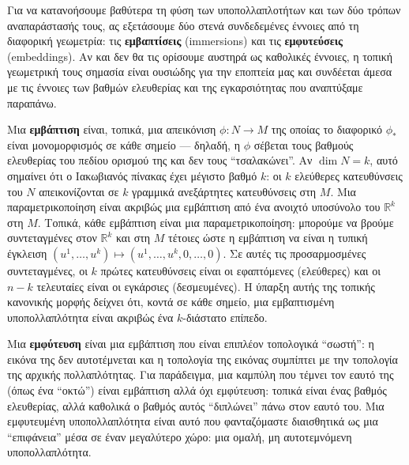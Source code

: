 \documentclass[12pt]{article}
\begin{document}
Για να κατανοήσουμε βαθύτερα τη φύση των υποπολλαπλοτήτων και των δύο τρόπων αναπαράστασής τους, ας εξετάσουμε δύο στενά συνδεδεμένες έννοιες από τη διαφορική γεωμετρία: τις \textbf{εμβαπτίσεις} (immersions) και τις \textbf{εμφυτεύσεις} (embeddings). Αν και δεν θα τις ορίσουμε αυστηρά ως καθολικές έννοιες, η τοπική γεωμετρική τους σημασία είναι ουσιώδης για την εποπτεία μας και συνδέεται άμεσα με τις έννοιες των βαθμών ελευθερίας και της εγκαρσιότητας που αναπτύξαμε παραπάνω.

Μια \textbf{εμβάπτιση} είναι, τοπικά, μια απεικόνιση $\phi: N \to M$ της οποίας το διαφορικό $\phi_*$ είναι μονομορφισμός σε κάθε σημείο --- δηλαδή, η $\phi$ σέβεται τους βαθμούς ελευθερίας του πεδίου ορισμού της και δεν τους ``τσαλακώνει''. Αν $\dim N = k$, αυτό σημαίνει ότι ο Ιακωβιανός πίνακας έχει μέγιστο βαθμό $k$: οι $k$ ελεύθερες κατευθύνσεις του $N$ απεικονίζονται σε $k$ γραμμικά ανεξάρτητες κατευθύνσεις στη $M$. Μια παραμετρικοποίηση είναι ακριβώς μια εμβάπτιση από ένα ανοιχτό υποσύνολο του $\mathbb{R}^k$ στη $M$. Τοπικά, κάθε εμβάπτιση είναι μια παραμετρικοποίηση: μπορούμε να βρούμε συντεταγμένες στον $\mathbb{R}^k$ και στη $M$ τέτοιες ώστε η εμβάπτιση να είναι η τυπική έγκλειση $(u^1, \dots, u^k) \mapsto (u^1, \dots, u^k, 0, \dots, 0)$. Σε αυτές τις προσαρμοσμένες συντεταγμένες, οι $k$ πρώτες κατευθύνσεις είναι οι εφαπτόμενες (ελεύθερες) και οι $n-k$ τελευταίες είναι οι εγκάρσιες (δεσμευμένες). Η ύπαρξη αυτής της τοπικής κανονικής μορφής δείχνει ότι, κοντά σε κάθε σημείο, μια εμβαπτισμένη υποπολλαπλότητα είναι ακριβώς ένα $k$-διάστατο επίπεδο.

Μια \textbf{εμφύτευση} είναι μια εμβάπτιση που είναι επιπλέον τοπολογικά ``σωστή'': η εικόνα της δεν αυτοτέμνεται και η τοπολογία της εικόνας συμπίπτει με την τοπολογία της αρχικής πολλαπλότητας. Για παράδειγμα, μια καμπύλη που τέμνει τον εαυτό της (όπως ένα ``οκτώ'') είναι εμβάπτιση αλλά όχι εμφύτευση: τοπικά είναι ένας βαθμός ελευθερίας, αλλά καθολικά ο βαθμός αυτός ``διπλώνει'' πάνω στον εαυτό του. Μια εμφυτευμένη υποπολλαπλότητα είναι αυτό που φανταζόμαστε διαισθητικά ως μια ``επιφάνεια'' μέσα σε έναν μεγαλύτερο χώρο: μια ομαλή, μη αυτοτεμνόμενη υποπολλαπλότητα.
\end{document}
